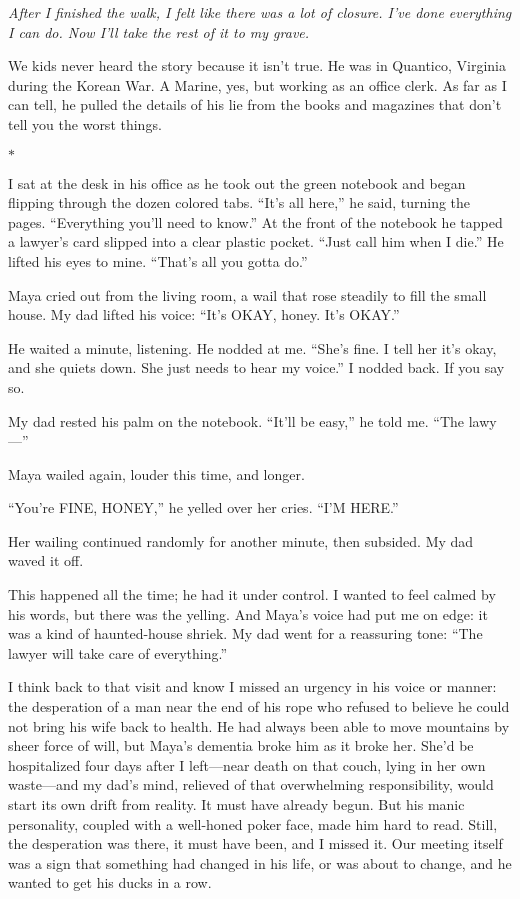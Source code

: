 \documentclass[12pt]{book}
\begin{document}
\textit{After I finished the walk, I felt like there was a lot of closure. I've done everything I can do. Now I'll take the rest of it to my grave.}

We kids never heard the story because it isn't true. He was in Quantico, Virginia during the Korean War. A Marine, yes, but working as an office clerk. As far as I can tell, he pulled the details of his lie from the books and magazines that don't tell you the worst things.

\begin{center}$*$\end{center}

I sat at the desk in his office as he took out the green notebook and began flipping through the dozen colored tabs. ``It's all here,'' he said, turning the pages. ``Everything you'll need to know.'' At the front of the notebook he tapped a lawyer's card slipped into a clear plastic pocket. ``Just call him when I die.'' He lifted his eyes to mine. ``That's all you gotta do.''

Maya cried out from the living room, a wail that rose steadily to fill the small house. My dad lifted his voice: ``It's OKAY, honey. It's OKAY.''

He waited a minute, listening. He nodded at me. ``She's fine. I tell her it's okay, and she quiets down. She just needs to hear my voice.'' I nodded back. If you say so.

My dad rested his palm on the notebook. ``It'll be easy,'' he told me. ``The lawy---''

Maya wailed again, louder this time, and longer.

``You're FINE, HONEY,'' he yelled over her cries. ``I'M HERE.''

Her wailing continued randomly for another minute, then subsided. My dad waved it off.

This happened all the time; he had it under control. I wanted to feel calmed by his words, but there was the yelling. And Maya's voice had put me on edge: it was a kind of haunted-house shriek. My dad went for a reassuring tone: ``The lawyer will take care of everything.''

I think back to that visit and know I missed an urgency in his voice or manner: the desperation of a man near the end of his rope who refused to believe he could not bring his wife back to health. He had always been able to move mountains by sheer force of will, but Maya's dementia broke him as it broke her. She'd be hospitalized four days after I left---near death on that couch, lying in her own waste---and my dad's mind, relieved of that overwhelming responsibility, would start its own drift from reality. It must have already begun. But his manic personality, coupled with a well-honed poker face, made him hard to read. Still, the desperation was there, it must have been, and I missed it. Our meeting itself was a sign that something had changed in his life, or was about to change, and he wanted to get his ducks in a row.
\end{document}
